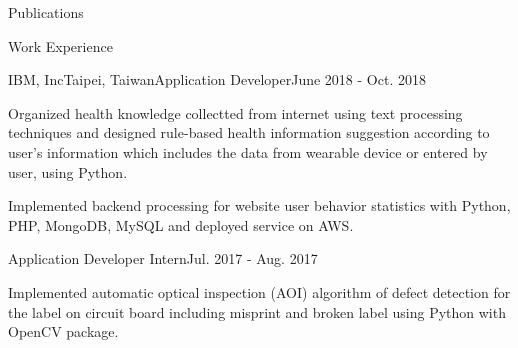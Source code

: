 \documentclass{resume} %
\begin{document}
\begin{rSection}{Publications}
    
    
    \begin{enumerate}[label={[\arabic*]}]
    \item {}
    \item {}
    \item {}
    \item {}
    \end{enumerate}    
\end{rSection}


\begin{rSection}{Work Experience}
    \begin{rSubsection}{IBM, Inc}{Taipei, Taiwan}{Application Developer}{June 2018 - Oct. 2018}
        \item Organized health knowledge collectted from internet using text processing techniques
        and designed rule-based health information suggestion according to user's information which includes the data from wearable device or entered by user, using Python.
        \item Implemented backend processing for website user behavior statistics with Python, PHP, MongoDB, MySQL and deployed service on AWS.
    \end{rSubsection}
    \begin{rSubsection}{}{}{Application Developer Intern}{Jul. 2017 - Aug. 2017}
        \item Implemented automatic optical inspection (AOI) algorithm of defect detection for the label on circuit board including misprint and broken label using Python with OpenCV package.
    \end{rSubsection}
\end{rSection}
\end{document}
